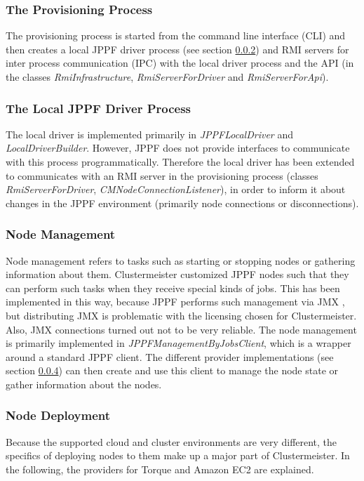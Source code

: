 \documentclass[english]{uzhpub}
\begin{document}
\subsubsection{The Provisioning Process}
The provisioning process is started from the command line interface (CLI) and then creates a local JPPF driver process (see section \ref{localdriver}) and RMI servers for inter process communication (IPC) with the local driver process and the API (in the classes \textit{RmiInfrastructure}, \textit{RmiServerForDriver} and \textit{RmiServerForApi}).

\subsubsection{The Local JPPF Driver Process}
\label{localdriver}
The local driver is implemented primarily in \textit{JPPFLocalDriver} and \textit{LocalDriverBuilder}. However, JPPF does not provide interfaces to communicate with this process programmatically. Therefore the local driver has been extended to communicates with an RMI server in the provisioning process (classes \textit{RmiServerForDriver}, \textit{CMNodeConnectionListener}), in order to inform it about changes in the JPPF environment (primarily node connections or disconnections).

\subsubsection{Node Management}

Node management refers to tasks such as starting or stopping nodes or gathering information about them. Clustermeister customized JPPF nodes such that they can perform such tasks when they receive special kinds of jobs. This has been implemented in this way, because JPPF performs such management via JMX \cite{jmx}, but distributing JMX is problematic with the licensing chosen for Clustermeister. Also, JMX connections turned out not to be very reliable. The node management is primarily implemented in \textit{JPPFManagementByJobsClient}, which is a wrapper around a standard JPPF client. The different provider implementations (see section \ref{deployment}) can then create and use this client to manage the node state or gather information about the nodes.

\subsubsection{Node Deployment}
\label{deployment}
Because the supported cloud and cluster environments are very different, the specifics of deploying nodes to them make up a major part of Clustermeister. In the following, the providers for Torque and Amazon EC2 are explained. 
\end{document}
